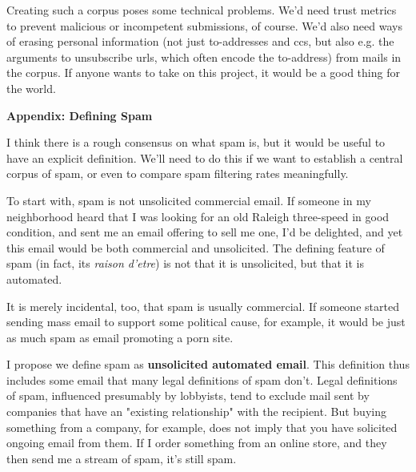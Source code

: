 Creating
                    such a corpus poses some technical problems. We'd need trust
                    metrics to prevent malicious or incompetent submissions, of
                    course. We'd also need ways of erasing personal information
                    (not just to-addresses and ccs, but also e.g. the arguments
                    to unsubscribe urls, which often encode the to-address) from
                    mails in the corpus. If anyone wants to take on this
                    project, it would be a good thing for the world.

\textbf{Appendix: Defining Spam}

I think there is a rough consensus on what spam
                    is, but it would be useful to have an explicit definition.
                    We'll need to do this if we want to establish a central
                    corpus of spam, or even to compare spam filtering rates
                    meaningfully.

To start with, spam is not
                    unsolicited commercial email. If someone in my neighborhood
                    heard that I was looking for an old Raleigh three-speed in
                    good condition, and sent me an email offering to sell me
                    one, I'd be delighted, and yet this email would be both
                    commercial and unsolicited. The defining feature of spam (in
                    fact, its \emph{raison d'etre}) is not that it is
                    unsolicited, but that it is automated.

It is
                    merely incidental, too, that spam is usually commercial. If
                    someone started sending mass email to support some political
                    cause, for example, it would be just as much spam as email
                    promoting a porn site.

I propose we define spam
                    as \textbf{unsolicited automated email}. This definition thus
                    includes some email that many legal definitions of spam
                    don't. Legal definitions of spam, influenced presumably by
                    lobbyists, tend to exclude mail sent by companies that have
                    an "existing relationship" with the recipient. But buying
                    something from a company, for example, does not imply that
                    you have solicited ongoing email from them. If I order
                    something from an online store, and they then send me a
                    stream of spam, it's still spam.

